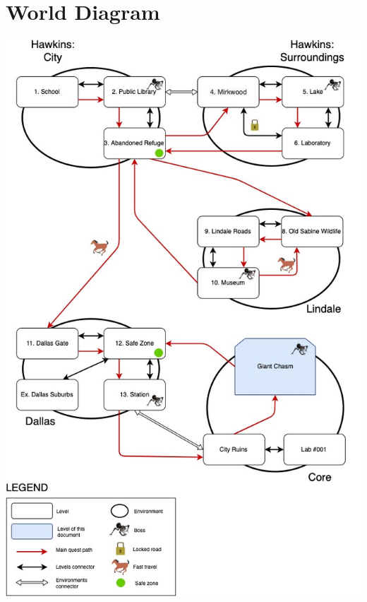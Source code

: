 \section{World Diagram}

\vspace*{1cm}
\begin{center}
	\includegraphics[width=0.8\linewidth]{images/graphs/worlddiagram.jpg}
\end{center}